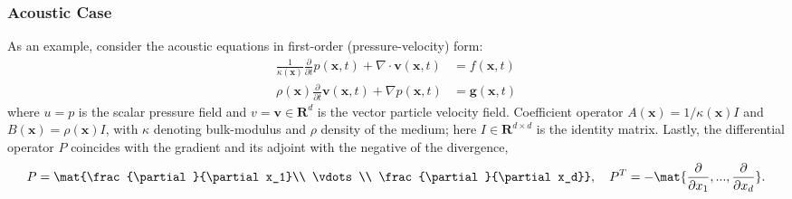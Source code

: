 



%

\subsubsection{Acoustic Case}

As an example, consider the acoustic equations in first-order (pressure-velocity) form:
\begin{equation}\label{eq:acoustics}
\begin{split}
	\frac{1}{\kappa(\mathbf x)} \frac{\partial}{\partial t} p(\mathbf x,t) + \nabla\cdot \mathbf v(\mathbf x,t) 
		&= f(\mathbf x,t)\\
	\rho(\mathbf x) \frac{\partial}{\partial t} \mathbf v(\mathbf x,t) + \nabla p(\mathbf x,t) 
		&= \mathbf g(\mathbf x,t)
\end{split}
\end{equation}
where $u=p$ is the scalar pressure field and $v=\mathbf v\in\mathbf R^d$ is the vector particle velocity field.
Coefficient operator $A(\mathbf x)=1/\kappa(\mathbf x)I$ and $B(\mathbf x)=\rho(\mathbf x) I$, with $\kappa$ denoting bulk-modulus and $\rho$ density of the medium; here $I\in\mathbf R^{d\times d}$ is the identity matrix.
Lastly, the differential operator $P$ coincides with the gradient and its adjoint with the negative of the divergence,
\[
	P = \mat{\frac{\partial}{\partial x_1}\\ \vdots \\ \frac{\partial}{\partial x_d}}, \quad 
	P^T = - \mat{\frac{\partial}{\partial x_1},...,\frac{\partial}{\partial x_d}}.
\]


